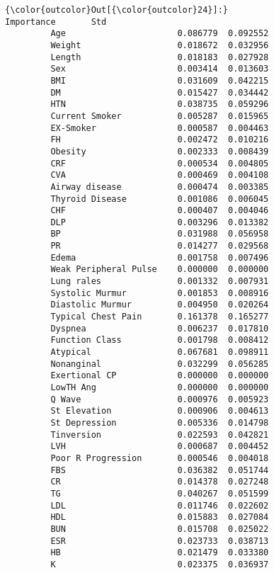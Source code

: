 \documentclass[11pt]{article}
\begin{document}
\begin{Verbatim}[commandchars=\\\{\}]
{\color{outcolor}Out[{\color{outcolor}24}]:}                        Importance       Std
         Age                      0.086779  0.092552
         Weight                   0.018672  0.032956
         Length                   0.018183  0.027928
         Sex                      0.003414  0.013603
         BMI                      0.031609  0.042215
         DM                       0.015427  0.034442
         HTN                      0.038735  0.059296
         Current Smoker           0.005287  0.015965
         EX-Smoker                0.000587  0.004463
         FH                       0.002472  0.010216
         Obesity                  0.002333  0.008439
         CRF                      0.000534  0.004805
         CVA                      0.000469  0.004108
         Airway disease           0.000474  0.003385
         Thyroid Disease          0.001086  0.006045
         CHF                      0.000407  0.004046
         DLP                      0.003296  0.013382
         BP                       0.031988  0.056958
         PR                       0.014277  0.029568
         Edema                    0.001758  0.007496
         Weak Peripheral Pulse    0.000000  0.000000
         Lung rales               0.001332  0.007931
         Systolic Murmur          0.001853  0.008916
         Diastolic Murmur         0.004950  0.020264
         Typical Chest Pain       0.161378  0.165277
         Dyspnea                  0.006237  0.017810
         Function Class           0.001798  0.008412
         Atypical                 0.067681  0.098911
         Nonanginal               0.032299  0.056285
         Exertional CP            0.000000  0.000000
         LowTH Ang                0.000000  0.000000
         Q Wave                   0.000976  0.005923
         St Elevation             0.000906  0.004613
         St Depression            0.005336  0.014798
         Tinversion               0.022593  0.042821
         LVH                      0.000687  0.004452
         Poor R Progression       0.000546  0.004018
         FBS                      0.036382  0.051744
         CR                       0.014378  0.027248
         TG                       0.040267  0.051599
         LDL                      0.011746  0.022602
         HDL                      0.015883  0.027084
         BUN                      0.015708  0.025022
         ESR                      0.023733  0.038713
         HB                       0.021479  0.033380
         K                        0.023375  0.036937

\end{Verbatim}
\end{document}
